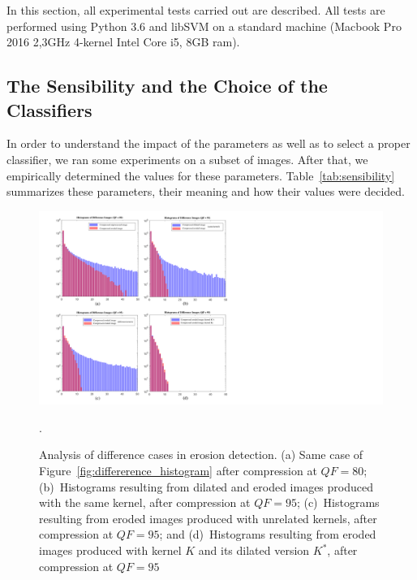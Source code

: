 \documentclass{ieeeaccess}
\begin{document}
In this section, all experimental tests carried out are described. 
All  tests are performed using Python 3.6 and libSVM on a standard machine (Macbook Pro 2016 2,3GHz 4-kernel Intel Core i5, 8GB ram).

\subsection{The Sensibility and the Choice of the Classifiers}
\label{subsec:sensibity}

In order to understand the impact of the parameters as well as to select a proper classifier, we ran some experiments on a subset of images. After that, we empirically determined the values for these parameters. Table~\ref{tab:sensibility} summarizes these parameters, their meaning and how their values were decided.
\begin{figure}[h!]
	\centering
	\includegraphics[width=0.8\linewidth]{morp_cases}
	\caption{Analysis of difference cases in erosion detection. (a) Same case of Figure~\ref{fig:differerence_histogram} after compression at $QF = 80$; (b)~Histograms resulting from dilated and eroded images produced with the same kernel, after compression at $QF=95$;
		(c)~Histograms resulting from eroded images produced with unrelated kernels, after compression at $QF=95$; and
		(d)~Histograms resulting from eroded images produced with kernel $K$ and its dilated version $K^*$, after compression at $QF=95$}.
	\label{fig:morp_cases}
\end{figure}
\end{document}
